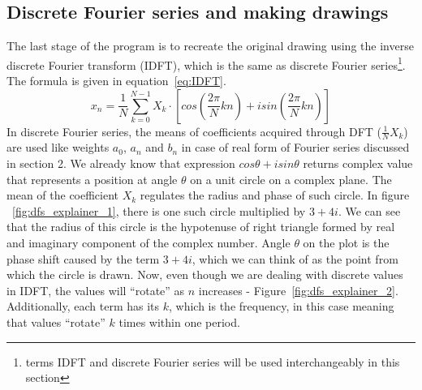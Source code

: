 \documentclass[titlepage]{article}
\begin{document}
\subsection{Discrete Fourier series and making drawings}

    The last stage of the program is to recreate the original drawing using the
    inverse discrete Fourier transform (IDFT), which is the same as discrete
    Fourier series\footnote{terms IDFT and discrete Fourier series will be used
    interchangeably in this section}. The formula is given in equation~\eqref{eq:IDFT}.
    \begin{equation}\label{eq:IDFT}
        x_n = \frac{1}{N}\sum_{k=0}^{N-1}X_k \cdot \left[cos\left(\frac{2\pi}{N}kn\right) +
        isin\left(\frac{2\pi}{N}kn\right)\right]
    \end{equation}
    In discrete Fourier series, the means of coefficients acquired through DFT 
    ($\frac{1}{N}X_k$) are used like weights $a_0$, $a_n$ and $b_n$ in case of 
    real form of Fourier series discussed in section 2. We already know that 
    expression $cos\theta + isin\theta$ returns complex value that represents a
    position at angle $\theta$ on a unit circle on a complex plane. The mean of
    the coefficient $X_k$ regulates the radius and phase of such circle. In figure
    ~\ref{fig:dfs_explainer_1}, there is one such circle multiplied by $3+4i$. We can
    see that the radius of this circle is the hypotenuse of right triangle formed
    by real and imaginary component of the complex number. Angle $\theta$ on the
    plot is the phase shift caused by the term $3+4i$, which we can think of as
    the point from which the circle is drawn. Now, even though we are 
    dealing with discrete values in IDFT, the values will ``rotate''
    as $n$ increases - Figure~\ref{fig:dfs_explainer_2}. Additionally, each term 
    has its $k$, which is the frequency, in this case meaning that values ``rotate''
    $k$ times within one period.
\end{document}
